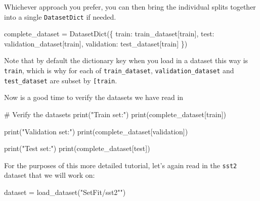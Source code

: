 \documentclass[
  letterpaper,
  DIV=11,
  numbers=noendperiod]{scrreprt}
\newenvironment{Shaded}{\begin{snugshade}}{\end{snugshade}}
\newcommand{\BuiltInTok}[1]{\textcolor[rgb]{0.00,0.23,0.31}{#1}}
\newcommand{\CommentTok}[1]{\textcolor[rgb]{0.37,0.37,0.37}{#1}}
\newcommand{\NormalTok}[1]{\textcolor[rgb]{0.00,0.23,0.31}{#1}}
\newcommand{\OperatorTok}[1]{\textcolor[rgb]{0.37,0.37,0.37}{#1}}
\newcommand{\StringTok}[1]{\textcolor[rgb]{0.13,0.47,0.30}{#1}}
\begin{document}
Whichever approach you prefer, you can then bring the individual splits
together into a single \texttt{DatasetDict} if needed.

\begin{Shaded}
\begin{Highlighting}[]
\NormalTok{complete\_dataset }\OperatorTok{=}\NormalTok{ DatasetDict(\{}
    \StringTok{\textquotesingle{}train\textquotesingle{}}\NormalTok{: train\_dataset[}\StringTok{\textquotesingle{}train\textquotesingle{}}\NormalTok{],}
    \StringTok{\textquotesingle{}test\textquotesingle{}}\NormalTok{: validation\_dataset[}\StringTok{\textquotesingle{}train\textquotesingle{}}\NormalTok{],}
    \StringTok{\textquotesingle{}validation\textquotesingle{}}\NormalTok{: test\_dataset[}\StringTok{\textquotesingle{}train\textquotesingle{}}\NormalTok{]}
\NormalTok{\})}
\end{Highlighting}
\end{Shaded}

Note that by default the dictionary key when you load in a dataset this
way is \texttt{train}, which is why for each of \texttt{train\_dataset},
\texttt{validation\_dataset} and \texttt{test\_dataset} are subset by
\texttt{{[}\textquotesingle{}train\textquotesingle{}{]}}.

Now is a good time to verify the datasets we have read in

\begin{Shaded}
\begin{Highlighting}[]
\CommentTok{\# Verify the datasets}
\BuiltInTok{print}\NormalTok{(}\StringTok{"Train set:"}\NormalTok{)}
\BuiltInTok{print}\NormalTok{(complete\_dataset[}\StringTok{\textquotesingle{}train\textquotesingle{}}\NormalTok{])}

\BuiltInTok{print}\NormalTok{(}\StringTok{"Validation set:"}\NormalTok{)}
\BuiltInTok{print}\NormalTok{(complete\_dataset[}\StringTok{\textquotesingle{}validation\textquotesingle{}}\NormalTok{])}

\BuiltInTok{print}\NormalTok{(}\StringTok{"Test set:"}\NormalTok{)}
\BuiltInTok{print}\NormalTok{(complete\_dataset[}\StringTok{\textquotesingle{}test\textquotesingle{}}\NormalTok{])}
\end{Highlighting}
\end{Shaded}

For the purposes of this more detailed tutorial, let's again read in the
\texttt{sst2} dataset that we will work on:

\begin{Shaded}
\begin{Highlighting}[]
\NormalTok{dataset }\OperatorTok{=}\NormalTok{ load\_dataset(}\StringTok{"SetFit/sst2"")}
\end{Highlighting}
\end{Shaded}
\end{document}
